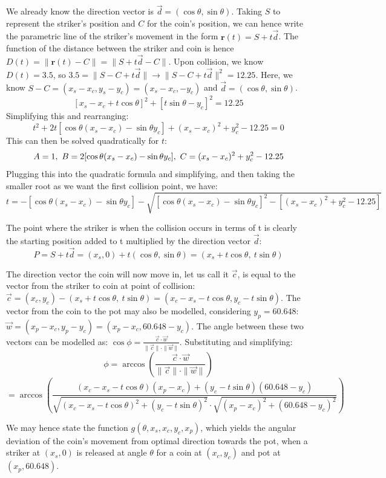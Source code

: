 \documentclass[10pt]{article}
\begin{document}
We already know the direction vector is $\vec{d} = (\cos \theta, \sin \theta)$. Taking $S$ to represent the striker's position and $C$ for the coin's position, we can hence write the parametric line of the striker's movement in the form $\mathbf{r}(t) = S+t\vec{d}$. The function of the distance between the striker and coin is hence $D(t) =  \|\mathbf{r}(t) - C\|  =  \|S + t \vec{d} - C\|$. Upon collision, we know $D(t)=3.5$, so $3.5 = \|S-C + t \vec{d}\| \longrightarrow \|S-C + t \vec{d}\|^2=12.25$.
Here, we know $S-C=(x_s-x_c,y_s-y_c)=(x_s-x_c,-y_c)$ and $\vec{d} =(\cos\theta,\sin\theta)$.
\[
[x_s-x_c+t\cos\theta]^2+[t\sin\theta-y_c]^2=12.25
\]
Simplifying this and rearranging:
\[
t^2 + 2t[\cos \theta (x_s - x_c) - \sin \theta y_c] + (x_s - x_c)^2 + y_c^2 - 12.25 = 0 
\]
This can then be solved quadratically for $t$:
\[
A = 1,\ B = 2[\cos \theta (x_s - x_c) - \sin \theta y_c],\ C = (x_s - x_c)^2 + y_c^2 - 12.25 \\
\]
Plugging this into the quadratic formula and simplifying, and then taking the smaller root as we want the first collision point, we have:
\[
t = -\left[\cos \theta (x_s - x_c) - \sin \theta y_c\right] 
- 
\sqrt{
\left[\cos \theta (x_s - x_c) - \sin \theta y_c\right]^2 
- 
\left[(x_s - x_c)^2 + y_c^2 - 12.25\right]
}
\]

The point where the striker is when the collision occurs in terms of t is clearly the starting position added to t multiplied by the direction vector $\vec{d}$:
\[
P = S+t\vec{d} = (x_s,0)+t(\cos\theta,\sin\theta) =\left( x_s + t \cos \theta,\ t \sin \theta \right)
\]

The direction vector the coin will now move in, let us call it $\vec{c}$, is equal to the vector from the striker to coin at point of collision: $\vec{c}=(x_c,y_c)-\left( x_s + t \cos \theta,\ t \sin \theta \right) = (x_c-x_s-t\cos\theta,y_c-t\sin\theta)$.
The vector from the coin to the pot may also be modelled, considering $y_p = 60.648$: $\vec{w} = (x_{p} - x_c, y_p - y_c) = (x_p - x_c, 60.648 - y_c)$. The angle between these two vectors can be modelled as: $\cos \phi = \frac{\vec{c} \cdot \vec{w}}{\|\vec{c}\| \cdot \|\vec{w}\|}$. Substituting and simplifying:
\[
\phi = \arccos\left(\frac{\vec{c} \cdot \vec{w}}{\|\vec{c}\| \cdot \|\vec{w}\|}\right)\]\[= \arccos\left(\frac{(x_c-x_s-t\cos\theta)(x_p - x_c)+(y_c-t\sin\theta)(60.648 - y_c)}{\sqrt{
(x_c-x_s-t\cos\theta)^2 + (y_c-t\sin\theta)^2
}\cdot \sqrt{
(x_p - x_c)^2 + (60.648 - y_c)^2
}}\right)
\]

We may hence state the function $g(\theta,x_s,x_c,y_c,x_p)$, which yields the angular deviation of the coin's movement from optimal direction towards the pot, when a striker at $(x_s,0)$ is released at angle $\theta$ for a coin at $(x_c,y_c)$ and pot at $(x_p,60.648)$. 
\end{document}
